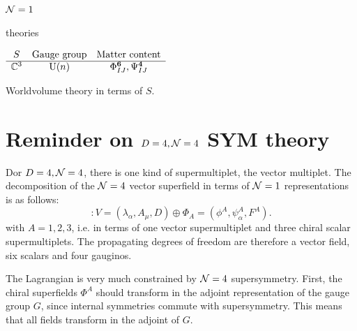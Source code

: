 \documentclass[a4paper,11pt]{article}
\begin{document}
    \subsection{$\mathcal{N}=1$} theories


    \vspace{5cm}

    \begin{table}[H]
        \centering
        $
        \begin{array}{ccc}
            S & \text{Gauge group} & \text{Matter content} \\ \hline
            \mathbb{C}^3 & \text{U}(n) & \Phi^{\boldsymbol{6}}_{IJ},\Psi^{\boldsymbol{4}}_{IJ}
        \end{array}
        $
        \caption{Worldvolume theory in terms of $S$.}
    \end{table}

\pagebreak
\appendix

\section{Reminder on $D=4,\mathcal{N}=4$ SYM theory}\label{sec:N4SCFT}
        
    Dor $D=4,\mathcal{N}=4$, there is one kind of supermultiplet, the vector multiplet. The decomposition of the $\mathcal{N} = 4$ vector superfield in terms of $\mathcal{N} = 1$ representations is as follows:
    \begin{equation}
        [\mN = 4 \text{ vector multiplet}] : V = (\lambda_\alpha, A_\mu, D) \oplus \Phi_A = (\phi^A,\psi^A_\alpha,F^A).
    \end{equation}
    with $A=1,2,3$, i.e. in terms of one vector supermultiplet and three chiral scalar supermultiplets. The propagating degrees of freedom are therefore a vector field, six scalars and four gauginos.
    
    The Lagrangian is very much constrained by $\mathcal{N} = 4$ supersymmetry. First, the chiral superfields $\Phi^A$ should transform in the adjoint representation of the gauge group $G$, since internal symmetries commute with supersymmetry. This means that all fields transform in the adjoint of $G$.
    
\end{document}
